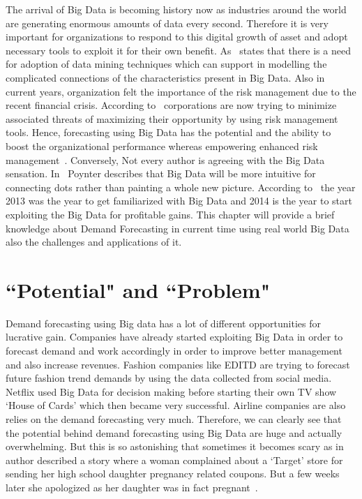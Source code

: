 The arrival of Big Data is becoming history now as industries around the world are generating enormous amounts of data every second. Therefore it is very important for organizations to respond to this digital growth of asset and adopt necessary tools to exploit it for their own benefit. As~\cite{varian} states that there is a need for adoption of data mining techniques which can support in modelling the complicated connections of the characteristics present in Big Data. Also in current years, organization felt the importance of the risk management due to the recent financial crisis. According to~\cite{silva} corporations are now trying to minimize associated threats of maximizing their opportunity by using risk management tools. Hence, forecasting using Big Data has the potential and the ability to boost the organizational performance whereas empowering enhanced risk management~\cite{brown2011you}.
Conversely, Not every author is agreeing with the Big Data sensation. In~\cite{KAUFMAN199629} Poynter describes that Big Data will be more intuitive for connecting dots rather than painting a whole new picture. According to~\cite{walker} the year 2013 was the year to get familiarized with Big Data and 2014 is the year to start exploiting the Big Data for profitable gains. This chapter will provide a brief knowledge about Demand Forecasting in current time using real world Big Data also the challenges and applications of it. 


\section{``Potential"  and  ``Problem"}
\label{PaP}


Demand forecasting using Big data has a lot of different opportunities for lucrative gain. Companies have already started exploiting Big Data in order to forecast demand and work accordingly in order to improve better management and also increase revenues. Fashion companies like EDITD are trying to forecast future fashion trend demands by using the data collected from social media. Netflix used Big Data for decision making before starting their own TV show ‘House of Cards’ which then became very successful. Airline companies are also relies on the demand forecasting very much. Therefore, we can clearly see that the potential behind demand forecasting using Big Data are huge and actually overwhelming. But this is so astonishing that sometimes it becomes scary as in~\cite{duhigg2012companies} author described a story where a woman complained about a ‘Target’ store for sending her high school daughter pregnancy related coupons. But a few weeks later she apologized as her daughter was in fact pregnant~\cite{duhigg2012companies}. 


